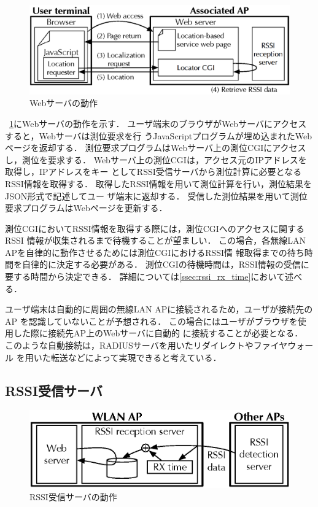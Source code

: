 \documentclass[technicalreport]{ieicej}
\begin{document}
\begin{figure}[bt]
 \centering
 \includegraphics[width=\columnwidth]{figure/web_server.eps}
 \caption{Webサーバの動作}
 \label{fig:web_server}
\end{figure}

\figurename~\ref{fig:web_server}にWebサーバの動作を示す．
ユーザ端末のブラウザがWebサーバにアクセスすると，Webサーバは測位要求を行
うJavaScriptプログラムが埋め込まれたWebページを返却する．
測位要求プログラムはWebサーバ上の測位CGIにアクセスし，測位を要求する．
Webサーバ上の測位CGIは，アクセス元のIPアドレスを取得し，IPアドレスをキー
としてRSSI受信サーバから測位計算に必要となるRSSI情報を取得する．
取得したRSSI情報を用いて測位計算を行い，測位結果をJSON形式で記述してユー
ザ端末に返却する．
受信した測位結果を用いて測位要求プログラムはWebページを更新する．

測位CGIにおいてRSSI情報を取得する際には，測位CGIへのアクセスに関するRSSI
情報が収集されるまで待機することが望ましい．
この場合，各無線LAN APを自律的に動作させるためには測位CGIにおけるRSSI情
報取得までの待ち時間を自律的に決定する必要がある．
測位CGIの待機時間は，RSSI情報の受信に要する時間から決定できる．
詳細については\ref{ssec:rssi_rx_time}において述べる．


ユーザ端末は自動的に周囲の無線LAN APに接続されるため，ユーザが接続先のAP
を認識していないことが予想される．
この場合にはユーザがブラウザを使用した際に接続先AP上のWebサーバに自動的
に接続することが必要となる．
このような自動接続は，RADIUSサーバを用いたリダイレクトやファイヤウォール
を用いた転送などによって実現できると考えている．

\subsection{RSSI受信サーバ}

\begin{figure}[bt]
 \centering
 \includegraphics[width=0.8\columnwidth]{figure/rssi_rx_server.eps}
 \caption{RSSI受信サーバの動作}
 \label{fig:rssi_rx_server}
\end{figure}
\end{document}
